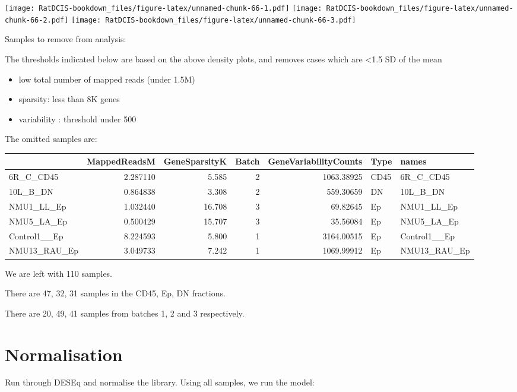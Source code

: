 \documentclass[
]{book}
\providecommand{\tightlist}{%
  \setlength{\itemsep}{0pt}\setlength{\parskip}{0pt}}
\begin{document}
\texttt{[image: RatDCIS-bookdown\_files/figure-latex/unnamed-chunk-66-1.pdf]} \texttt{[image: RatDCIS-bookdown\_files/figure-latex/unnamed-chunk-66-2.pdf]} \texttt{[image: RatDCIS-bookdown\_files/figure-latex/unnamed-chunk-66-3.pdf]}

Samples to remove from analysis:

The thresholds indicated below are based on the above density plots, and removes cases which are \textless1.5 SD of the mean

\begin{itemize}
\tightlist
\item
  low total number of mapped reads (under 1.5M)
\item
  sparsity: less than 8K genes
\item
  variability : threshold under 500
\end{itemize}

The omitted samples are:

\begin{tabular}{l|r|r|r|r|l|l}
\hline
  & MappedReadsM & GeneSparsityK & Batch & GeneVariabilityCounts & Type & names\\
\hline
6R\_C\_CD45 & 2.287110 & 5.585 & 2 & 1063.38925 & CD45 & 6R\_C\_CD45\\
\hline
10L\_B\_DN & 0.864838 & 3.308 & 2 & 559.30659 & DN & 10L\_B\_DN\\
\hline
NMU1\_LL\_Ep & 1.032440 & 16.708 & 3 & 69.82645 & Ep & NMU1\_LL\_Ep\\
\hline
NMU5\_LA\_Ep & 0.500429 & 15.707 & 3 & 35.56084 & Ep & NMU5\_LA\_Ep\\
\hline
Control1\_\_Ep & 8.224593 & 5.800 & 1 & 3164.00515 & Ep & Control1\_\_Ep\\
\hline
NMU13\_RAU\_Ep & 3.049733 & 7.242 & 1 & 1069.99912 & Ep & NMU13\_RAU\_Ep\\
\hline
\end{tabular}

We are left with 110 samples.

There are 47, 32, 31 samples in the CD45, Ep, DN fractions.

There are 20, 49, 41 samples from batches 1, 2 and 3 respectively.

\hypertarget{normalisation}{%
\section{Normalisation}\label{normalisation}}

Run through DESEq and normalise the library. Using all samples, we run the model:
\end{document}

